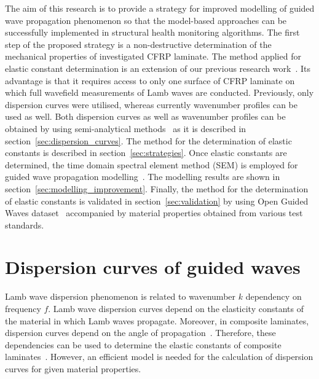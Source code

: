 \documentclass[preprint,12pt]{elsarticle}
\begin{document}
The aim of this research is to provide a strategy for improved modelling of guided wave propagation phenomenon so that the model-based approaches can be successfully implemented in structural health monitoring algorithms.
The first step of the proposed strategy is a non-destructive determination of the mechanical properties of investigated CFRP laminate.
The method applied for elastic constant determination is an extension of our previous research work~\cite{Kudela2020}.	
Its advantage is that it requires access to only one surface of CFRP laminate on which full wavefield measurements of Lamb waves are conducted.
Previously, only dispersion curves were utilised, whereas currently wavenumber profiles can be used as well.
Both dispersion curves as well as wavenumber profiles can be obtained by using semi-analytical methods~\cite{Bartoli2006,Marzani2008} as it is described in section~\ref{sec:dispersion_curves}.
The method for the determination of elastic constants is described in section~\ref{sec:strategies}.
Once elastic constants are determined, the time domain spectral element method (SEM) is employed for guided wave propagation modelling~\cite{Kudela2020a}.
The modelling results are shown in section~\ref{sec:modelling_improvement}.
Finally, the method for the determination of elastic constants is validated in section~\ref{sec:validation} by using Open Guided Waves dataset~\cite{Moll2019} accompanied by material properties obtained from various test standards.

\section{Dispersion curves of guided waves \label{sec:dispersion_curves}}
Lamb wave dispersion phenomenon is related to wavenumber $k$ dependency on frequency $f$. 
Lamb wave dispersion curves depend on the elasticity constants of the material in which Lamb waves propagate. 
Moreover, in composite laminates, dispersion curves depend on the angle of propagation~\cite{Rose1999}. 
Therefore, these dependencies can be used to determine the elastic constants of composite laminates~\cite{Kudela2020}.
However, an efficient model is needed for the calculation of dispersion curves for given material properties.

\end{document}
